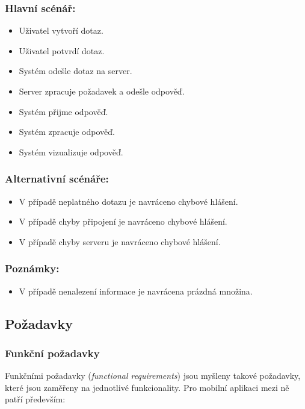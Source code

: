 \subsubsection*{Hlavní scénář:}
\begin{itemize}
 \item Uživatel vytvoří dotaz.
 \item Uživatel potvrdí dotaz.
 \item Systém odešle dotaz na server.
 \item Server zpracuje požadavek a odešle odpověď.
 \item Systém přijme odpověď.
 \item Systém zpracuje odpověď.
 \item Systém vizualizuje odpověď.
\end{itemize}
\subsubsection*{Alternativní scénáře:}
\begin{itemize}
 \item V případě neplatného dotazu je navráceno chybové hlášení.
 \item V případě chyby připojení je navráceno chybové hlášení.
 \item V případě chyby serveru je navráceno chybové hlášení.
\end{itemize}
\subsubsection*{Poznámky:}
\begin{itemize}
 \item V případě nenalezení informace je navrácena prázdná množina.
\end{itemize}


\subsection{Požadavky}
\subsubsection{Funkční požadavky}
Funkčními požadavky (\textit{functional requirements}) jsou myšleny takové požadavky, které jsou zaměřeny na jednotlivé funkcionality. Pro mobilní aplikaci mezi ně patří především:

